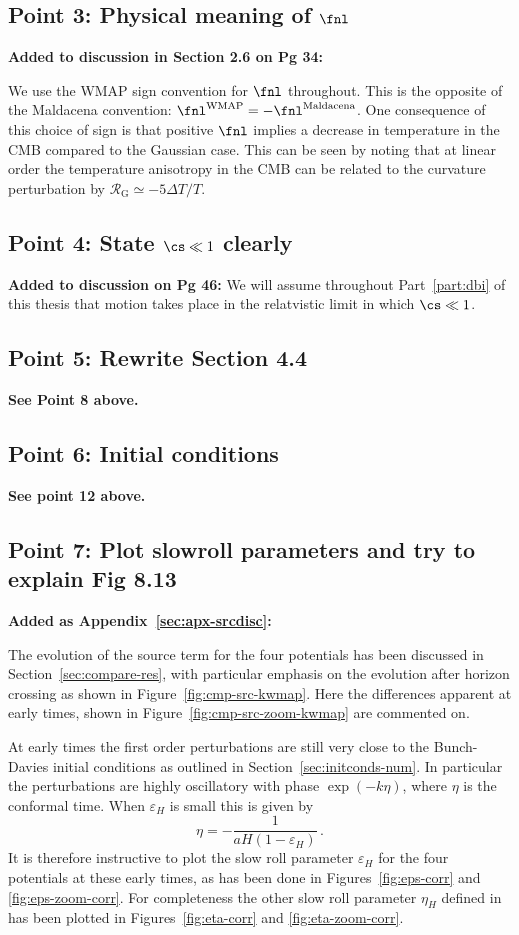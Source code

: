 \subsection{Point 3: Physical meaning of $\fnl$}
\textbf{Added to discussion in Section 2.6 on Pg 34:}

We use the WMAP sign convention for $\fnl$ throughout. 
This is the opposite of the Maldacena convention:
$\fnl^\mathrm{WMAP}=-\fnl^\mathrm{Maldacena}$. One consequence of this choice of sign is that
positive $\fnl$ implies a decrease in temperature in the CMB compared to the Gaussian case. This
can be seen by noting that at linear order the temperature anisotropy in the CMB can be related to
the curvature perturbation by $\mathcal{R}_\mathrm{G}\simeq -5 \Delta T/T$.

\subsection{Point 4: State $\cs\ll 1$ clearly}
\textbf{Added to discussion on Pg 46:}
We will assume throughout Part~\ref{part:dbi} of this thesis that motion takes
place in the relatvistic limit in which $\cs\ll1$.

\subsection{Point 5: Rewrite Section 4.4}
\textbf{See Point 8 above.}

\subsection{Point 6: Initial conditions}
\textbf{See point 12 above.}

\subsection{Point 7: Plot slowroll parameters and try to explain Fig 8.13}

\textbf{Added as Appendix~\ref{sec:apx-srcdisc}:}

The evolution of the source term for the four potentials has been discussed in
Section~\ref{sec:compare-res}, with particular emphasis on the evolution after horizon crossing as
shown in Figure~\ref{fig:cmp-src-kwmap}. Here the differences apparent at early times, shown in
Figure~\ref{fig:cmp-src-zoom-kwmap} are commented on.

At early times the first order perturbations are still very close to the Bunch-Davies initial
conditions as outlined in Section~\ref{sec:initconds-num}. In particular the perturbations are
highly oscillatory with phase $\exp(-k\eta)$, where $\eta$ is the conformal time. When
$\varepsilon_H$ is small this is given by 
% 
\begin{equation}
 \eta = -\frac{1}{aH(1-\varepsilon_H)}\,.
\end{equation}
% 
It is therefore instructive to plot the slow roll parameter $\varepsilon_H$ for the four potentials
at these early times, as has been done in Figures~\ref{fig:eps-corr} and \ref{fig:eps-zoom-corr}.
For
completeness the other slow roll parameter $\eta_H$ defined in  has been
plotted in Figures~\ref{fig:eta-corr} and \ref{fig:eta-zoom-corr}. 

